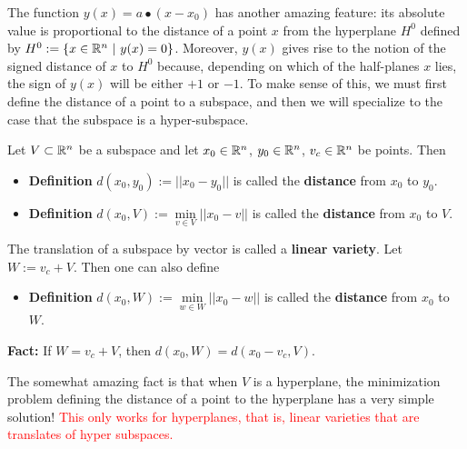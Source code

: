 
The function $y(x)= a\bullet (x-x_0)$ has another amazing feature: its absolute value is proportional to the distance of a point $x$ from the hyperplane $H^0$ defined by $H^0:=\{ x \in \mathbb R^n~|~y(x)=0 \}$. Moreover, $y(x)$ gives rise to the notion of the signed distance of $x$ to $H^0$ because, depending on which of the half-planes $x$ lies, the sign of $y(x)$ will be either $+1$ or $-1$. To make sense of this, we must first define the distance of a point to a subspace, and then we will specialize to the case that the subspace is a hyper-subspace.\\

\begin{tcolorbox}[title=\textbf{From Norms to Distances}]
Let $V\subset \mathbb R^n$ be a subspace and let $x_0\in \mathbb R^n$, $y_0\in \mathbb R^n$, $v_c\in \mathbb R^n$ be points. Then 
\begin{itemize}
    \item \textbf{Definition} $d(x_0, y_0):=||x_0 - y_0 ||$ is called the \textbf{distance} from $x_0$ to $y_0$.
    \item  \textbf{Definition} $d(x_0,V):=\min\limits_{v \in V} ||x_0 - v ||$ is called the \textbf{distance} from $x_0$ to $V$.
\end{itemize}
The translation of a subspace by vector is called a \textbf{linear variety}. Let $W:=v_c + V$. Then one can also define
\begin{itemize}
    \item \textbf{Definition} $d(x_0,W):=\min\limits_{w \in W} ||x_0 - w ||$ is called the \textbf{distance} from $x_0$ to $W$.
    \end{itemize}
\end{tcolorbox}

\textbf{Fact:} If $W=v_c+V$, then $d(x_0, W)=d(x_0-v_c,V)$.
\vspace*{0.2cm}

The somewhat amazing fact is that when $V$ is a hyperplane, the minimization problem defining the distance of a point to the hyperplane has a very simple solution! \textcolor{red}{This only works for hyperplanes, that is, linear varieties that are translates of hyper subspaces.}

\vspace*{0.2cm}


